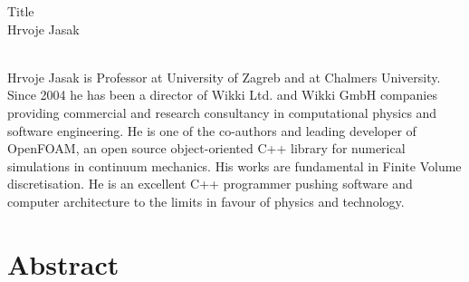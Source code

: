     { 
			{Title} \\ 			
    \normalfont\small Hrvoje Jasak }
    
    {  \\    
    } 
      {  } 
	\vspace{1cm} 
	Hrvoje Jasak is Professor at University of Zagreb and at Chalmers University. Since 2004 he has been a director of Wikki Ltd. and Wikki GmbH companies providing commercial and research consultancy in computational physics and software engineering. He is one of the co-authors and leading developer of OpenFOAM, an open source object-oriented C++ library for numerical simulations in continuum mechanics. His works are fundamental in Finite Volume discretisation. He is an excellent C++ programmer pushing software and computer architecture to the limits in favour of physics and technology.
	
	\section*{Abstract}
	
         
    \vspace{.5cm}
    \newpage
    
